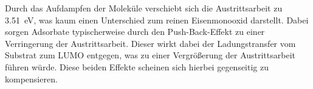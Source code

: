             Durch das Aufdampfen der Moleküle verschiebt sich die Austrittsarbeit zu \SI{3.51}{\electronvolt}, was kaum einen Unterschied zum reinen Eisenmonooxid darstellt.
            Dabei sorgen Adsorbate typischerweise durch den Push-Back-Effekt zu einer Verringerung der Austrittsarbeit.
            Dieser wirkt dabei der Ladungstransfer vom Substrat zum LUMO entgegen, was zu einer Vergrößerung der Austrittsarbeit führen würde.
            Diese beiden Effekte scheinen sich hierbei gegenseitig zu kompensieren.

  


